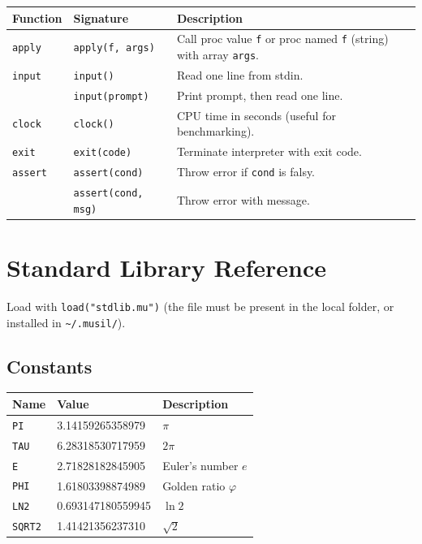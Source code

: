 \documentclass[11pt,a4paper]{article}
\newcommand{\musil}[1]{\lstinline[style=musilinline]{#1}}
\begin{document}
\begin{longtable}{@{}L{3.2cm}L{4.5cm}L{6.8cm}@{}}
\toprule
\textbf{Function} & \textbf{Signature} & \textbf{Description} \\
\midrule
\endhead
\texttt{apply}   & \texttt{apply(f, args)}      & Call proc value \texttt{f} or proc named \texttt{f} (string) with array \texttt{args}. \\
\texttt{input}   & \texttt{input()}             & Read one line from stdin. \\
                 & \texttt{input(prompt)}       & Print prompt, then read one line. \\
\texttt{clock}   & \texttt{clock()}             & CPU time in seconds (useful for benchmarking). \\
\texttt{exit}    & \texttt{exit(code)}          & Terminate interpreter with exit code. \\
\texttt{assert}  & \texttt{assert(cond)}        & Throw error if \texttt{cond} is falsy. \\
                 & \texttt{assert(cond, msg)}   & Throw error with message. \\
\bottomrule
\end{longtable}

\section{Standard Library Reference}
\label{sec:stdlib}

Load with \musil{load("stdlib.mu")} (the
file must be present in the local folder, or installed in \texttt{\textasciitilde/.musil/}).

\subsection{Constants}

\begin{center}
\begin{tabular}{@{}lll@{}}
\toprule
\textbf{Name} & \textbf{Value} & \textbf{Description} \\
\midrule
\texttt{PI}    & 3.14159265358979 & $\pi$ \\
\texttt{TAU}   & 6.28318530717959 & $2\pi$ \\
\texttt{E}     & 2.71828182845905 & Euler's number $e$ \\
\texttt{PHI}   & 1.61803398874989 & Golden ratio $\varphi$ \\
\texttt{LN2}   & 0.693147180559945 & $\ln 2$ \\
\texttt{SQRT2} & 1.41421356237310 & $\sqrt{2}$ \\
\bottomrule
\end{tabular}
\end{center}
\end{document}
